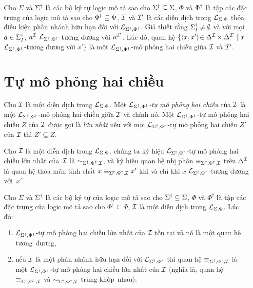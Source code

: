 \begin{Corollary}
\label{co:EquivalenceRelation}
	Cho $\Sigma$ và $\Sigma^\dag$ là các bộ ký tự logic mô tả sao cho $\Sigma^\dag \subseteq \Sigma$, $\Phi$ và $\Phi^\dag$ là tập các đặc trưng của logic mô tả sao cho $\Phi^\dag \subseteq \Phi$, $\mathcal{I}$ và $\mathcal{I}'$ là các diễn dịch trong $\mathcal{L}_{\Sigma,\Phi}$ thỏa điều kiện phân nhánh hữu hạn đối với $\mathcal{L}_{\Sigma^\dag,\Phi^\dag}$. Giả thiết rằng $\Sigma^\dag_I \not= \emptyset$ và với mọi $a \in \Sigma^\dag_I$, $a^{\mathcal{I}}$ $\mathcal{L}_{\Sigma^\dag,\Phi^\dag}$-tương đương với $a^{\mathcal{I}'}$.
	Lúc đó, quan hệ $\{\left\langle x, x'\right\rangle\! \in \Delta^{\mathcal{I}} \times \Delta^{\mathcal{I}'} \mid x $ $\mathcal{L}_{\Sigma^\dag,\Phi^\dag}$-tương đương với $x'\}$ là một $\mathcal{L}_{\Sigma^\dag,\Phi^\dag}$-mô phỏng hai chiều giữa $\mathcal{I}$ và $\mathcal{I}'$.\myend
\end{Corollary}

\section{Tự mô phỏng hai chiều}
\label{sec:Chap2.AutoBisimulation}

\begin{Definition}
\label{def:AutoBisimulation}
	Cho $\mathcal{I}$ là một diễn dịch trong $\mathcal{L}_{\Sigma,\Phi}$. Một {\em $\mathcal{L}_{\Sigma^\dag,\Phi^\dag}$-tự mô phỏng hai chiều} của $\mathcal{I}$ là một $\mathcal{L}_{\Sigma^\dag,\Phi^\dag}$-mô phỏng hai chiều giữa $\mathcal{I}$ và chính nó. Một $\mathcal{L}_{\Sigma^\dag,\Phi^\dag}$-tự mô phỏng hai chiều $Z$ của $\mathcal{I}$ được gọi là {\em lớn nhất} nếu với mọi $\mathcal{L}_{\Sigma^\dag,\Phi^\dag}$-tự mô phỏng hai chiều $Z'$ của $\mathcal{I}$ thì $Z' \subseteq Z$.\myend
\end{Definition}

Cho $\mathcal{I}$ là một diễn dịch trong $\mathcal{L}_{\Sigma,\Phi}$, chúng ta ký hiệu $\mathcal{L}_{\Sigma^\dag,\Phi^\dag}$-tự mô phỏng hai chiều lớn nhất của~$\mathcal{I}$ là $\sim_{\Sigma^\dag,\Phi^\dag,\mathcal{I}}$, và ký hiệu quan hệ nhị phân $\equiv_{\Sigma^\dag,\Phi^\dag,\mathcal{I}}$ trên $\Delta^{\mathcal{I}}$ là quan hệ thỏa mãn tính chất $x \equiv_{\Sigma^\dag,\Phi^\dag,\mathcal{I}} x'$ khi và chỉ khi $x$ $\mathcal{L}_{\Sigma^\dag,\Phi^\dag}$-tương đương với~$x'$.

\begin{Theorem} 
\label{th:AutoBisimulation}
	Cho $\Sigma$ và $\Sigma^\dag$ là các bộ ký tự của logic mô tả sao cho $\Sigma^\dag \subseteq \Sigma$, $\Phi$ và $\Phi^\dag$ là tập các đặc trưng của logic mô tả sao cho $\Phi^\dag \subseteq \Phi$, $\mathcal{I}$ là một diễn dịch trong $\mathcal{L}_{\Sigma,\Phi}$. Lúc đó:
	\begin{enumerate}
		\item $\mathcal{L}_{\Sigma^\dag,\Phi^\dag}$-tự mô phỏng hai chiều lớn nhất của $\mathcal{I}$ tồn tại và nó là một quan hệ tương~đương,\label{th:AutoBisimulation-item1}  
		\item nếu $\mathcal{I}$ là một phân nhánh hữu hạn đối với $\mathcal{L}_{\Sigma^\dag,\Phi^\dag}$ thì quan hệ $\equiv_{\Sigma^\dag,\Phi^\dag,\mathcal{I}}$ là một $\mathcal{L}_{\Sigma^\dag,\Phi^\dag}$-tự mô phỏng hai chiều lớn nhất của $\mathcal{I}$ (nghĩa là, quan hệ $\equiv_{\Sigma^\dag,\Phi^\dag,\mathcal{I}}$ và $\sim_{\Sigma^\dag,\Phi^\dag,\mathcal{I}}$ trùng khớp~nhau).\label{th:AutoBisimulation-item2}\myend
	\end{enumerate}
\end{Theorem}

